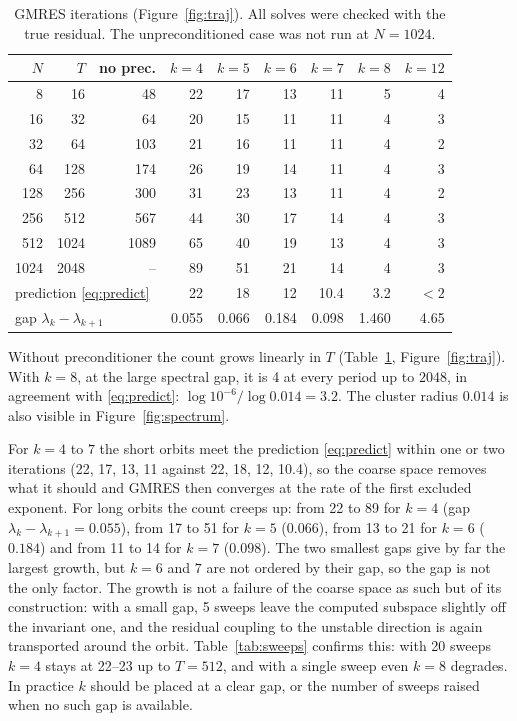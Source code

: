 \documentclass[11pt,a4paper]{article}
\begin{document}
\begin{table}[t]
\centering
\begin{tabular}{rrrrrrrrr}
\toprule
$N$ & $T$ & no prec. & $k = 4$ & $k = 5$ & $k = 6$ & $k = 7$ & $k = 8$ & $k = 12$\\
\midrule
8 & 16 & 48 & 22 & 17 & 13 & 11 & 5 & 4\\
16 & 32 & 64 & 20 & 15 & 11 & 11 & 4 & 3\\
32 & 64 & 103 & 21 & 16 & 11 & 11 & 4 & 2\\
64 & 128 & 174 & 26 & 19 & 14 & 11 & 4 & 3\\
128 & 256 & 300 & 31 & 23 & 13 & 11 & 4 & 2\\
256 & 512 & 567 & 44 & 30 & 17 & 14 & 4 & 3\\
512 & 1024 & 1089 & 65 & 40 & 19 & 13 & 4 & 3\\
1024 & 2048 & -- & 89 & 51 & 21 & 14 & 4 & 3\\
\midrule
\multicolumn{3}{l}{prediction \eqref{eq:predict}} & 22 & 18 & 12 & 10.4 & 3.2 & $<2$\\
\multicolumn{3}{l}{gap $\lambda_k - \lambda_{k+1}$} & 0.055 & 0.066 & 0.184 & 0.098 & 1.460 & 4.65\\
\bottomrule
\end{tabular}
\caption{GMRES iterations (Figure~\ref{fig:traj}). All solves were checked with the true residual. The unpreconditioned case was not run at $N = 1024$.}
\label{tab:traj}
\end{table}

Without preconditioner the count grows linearly in $T$ (Table~\ref{tab:traj}, Figure~\ref{fig:traj}). With $k = 8$, at the large spectral gap, it is 4 at every period up to $2048$, in agreement with \eqref{eq:predict}: $\log 10^{-6}/\log 0.014 = 3.2$. The cluster radius $0.014$ is also visible in Figure~\ref{fig:spectrum}.

For $k = 4$ to $7$ the short orbits meet the prediction \eqref{eq:predict} within one or two iterations (22, 17, 13, 11 against 22, 18, 12, 10.4), so the coarse space removes what it should and GMRES then converges at the rate of the first excluded exponent. For long orbits the count creeps up: from 22 to 89 for $k = 4$ (gap $\lambda_k - \lambda_{k+1} = 0.055$), from 17 to 51 for $k = 5$ ($0.066$), from 13 to 21 for $k = 6$ ($0.184$) and from 11 to 14 for $k = 7$ ($0.098$). The two smallest gaps give by far the largest growth, but $k = 6$ and $7$ are not ordered by their gap, so the gap is not the only factor. The growth is not a failure of the coarse space as such but of its construction: with a small gap, 5 sweeps leave the computed subspace slightly off the invariant one, and the residual coupling to the unstable direction is again transported around the orbit. Table~\ref{tab:sweeps} confirms this: with 20 sweeps $k = 4$ stays at 22--23 up to $T = 512$, and with a single sweep even $k = 8$ degrades. In practice $k$ should be placed at a clear gap, or the number of sweeps raised when no such gap is available.
\end{document}
